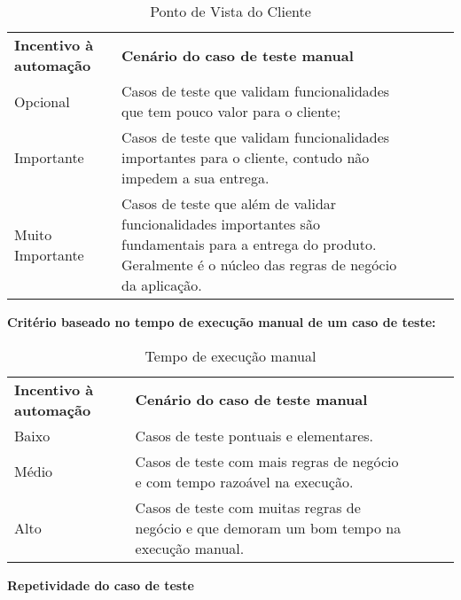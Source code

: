 \begin{table}[!ht]
\centering
\caption{Ponto de Vista do Cliente}
\label{my-label}
\begin{tabular}{|l|l|lll}
\cline{1-2}
\textbf{Incentivo à automação} & \textbf{Cenário do caso de teste manual}                                                                                                                                      &  &  &  \\ \cline{1-2}
Opcional              & Casos de teste que validam funcionalidades que tem pouco valor para o cliente;                                                                                       &  &  &  \\ \cline{1-2}
Importante            & Casos de teste que validam funcionalidades importantes para o cliente, contudo não impedem a sua entrega.                                                            &  &  &  \\ \cline{1-2}
Muito Importante      & Casos de teste que além de validar funcionalidades importantes são fundamentais para a entrega do produto. Geralmente é o núcleo das regras de negócio da aplicação. &  &  &  \\ \cline{1-2}
\end{tabular}
\end{table}

\textbf{Critério baseado no tempo de execução manual de um caso de teste:}

\begin{table}[!ht]
\centering
\caption{Tempo de execução manual}
\label{my-label}
\begin{tabular}{|l|l|lll}
\cline{1-2}
\textbf{Incentivo à automação} & \textbf{Cenário do caso de teste manual}                                                   &  &  &  \\ \cline{1-2}
Baixo                          & Casos de teste pontuais e elementares.                                                     &  &  &  \\ \cline{1-2}
Médio                          & Casos de teste com mais regras de negócio e com tempo razoável na execução.                &  &  &  \\ \cline{1-2}
Alto                           & Casos de teste com muitas regras de negócio e que demoram um bom tempo na execução manual. &  &  &  \\ \cline{1-2}
\end{tabular}
\end{table}

\textbf{Repetividade do caso de teste}

